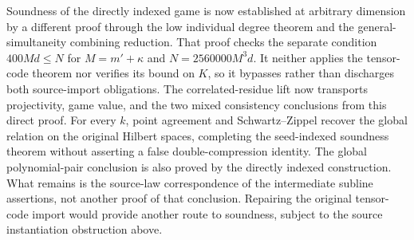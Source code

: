 \documentclass[11pt]{article}
\begin{document}
Soundness of the directly indexed game is now established at arbitrary
dimension by a different proof through the low individual degree theorem and
the general-simultaneity combining reduction.  That proof checks the separate
condition $400Md \le N$ for $M=m'+\kappa$ and $N=2560000M^3d$.  It neither
applies the tensor-code theorem nor verifies its bound on $K$, so it bypasses
rather than discharges both source-import obligations.  The correlated-residue
lift now transports projectivity, game value, and the two mixed consistency
conclusions from this direct proof. For every $k$, point agreement and
Schwartz--Zippel recover the global relation on the original Hilbert spaces,
completing the seed-indexed soundness theorem without asserting a false
double-compression identity.
The global polynomial-pair conclusion is also proved by the directly indexed
construction. What remains is the source-law correspondence of the intermediate
subline assertions, not another proof of that conclusion. Repairing the
original tensor-code import would provide another route to soundness, subject
to the source instantiation obstruction above.



\end{document}

